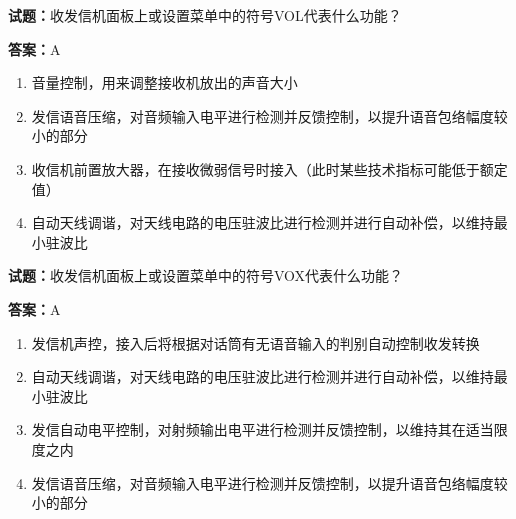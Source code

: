 \documentclass{ctexbook}
\begin{document}




\vspace{1em}

\textbf{试题：}收发信机面板上或设置菜单中的符号VOL代表什么功能？ 

\textbf{答案：}A 

\begin{enumerate}[leftmargin=3em]
  \item 音量控制，用来调整接收机放出的声音大小 

  \item 发信语音压缩，对音频输入电平进行检测并反馈控制，以提升语音包络幅度较小的部分 

  \item 收信机前置放大器，在接收微弱信号时接入（此时某些技术指标可能低于额定值） 

  \item 自动天线调谐，对天线电路的电压驻波比进行检测并进行自动补偿，以维持最小驻波比 

\end{enumerate}





\vspace{1em}

\textbf{试题：}收发信机面板上或设置菜单中的符号VOX代表什么功能？ 

\textbf{答案：}A 

\begin{enumerate}[leftmargin=3em]
  \item 发信机声控，接入后将根据对话筒有无语音输入的判别自动控制收发转换 

  \item 自动天线调谐，对天线电路的电压驻波比进行检测并进行自动补偿，以维持最小驻波比 

  \item 发信自动电平控制，对射频输出电平进行检测并反馈控制，以维持其在适当限度之内 

  \item 发信语音压缩，对音频输入电平进行检测并反馈控制，以提升语音包络幅度较小的部分 

\end{enumerate}



\end{document}
